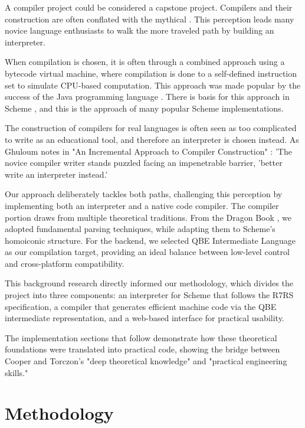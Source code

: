 \documentclass[final]{cmpreport_02}
\begin{document}
A compiler project could be considered a capstone project. Compilers and their construction are often conflated with the mythical \cite{ghuloum2006incremental}. This perception leads many novice language enthusiasts to walk the more traveled path by building an interpreter.

When compilation is chosen, it is often through a combined approach using a bytecode virtual machine, where compilation is done to a self-defined instruction set to simulate CPU-based computation. This approach was made popular by the success of the Java programming language \cite{oracle2024java}. There is basis for this approach in Scheme \cite{SchemeImplementations}, and this is the approach of many popular Scheme implementations.

The construction of compilers for real languages is often seen as too complicated to write as an educational tool, and therefore an interpreter is chosen instead. As Ghuloum notes in "An Incremental Approach to Compiler Construction" \cite{ghuloum2006incremental}:
'The novice compiler writer stands puzzled facing an impenetrable barrier, 'better write an interpreter instead.'

Our approach deliberately tackles both paths, challenging this perception by implementing both an interpreter and a native code compiler. The compiler portion draws from multiple theoretical traditions. From the Dragon Book \cite{aho2006compilers}, we adopted fundamental parsing techniques, while adapting them to Scheme's homoiconic structure. For the backend, we selected QBE Intermediate Language \cite{qbe_il} as our compilation target, providing an ideal balance between low-level control and cross-platform compatibility.

This background research directly informed our methodology, which divides the project into three components: an interpreter for Scheme that follows the R7RS specification, a compiler that generates efficient machine code via the QBE intermediate representation, and a web-based interface for practical usability.

The implementation sections that follow demonstrate how these theoretical foundations were translated into practical code, showing the bridge between Cooper and Torczon's "deep theoretical knowledge" and "practical engineering skills."

\section{Methodology}
\end{document}
